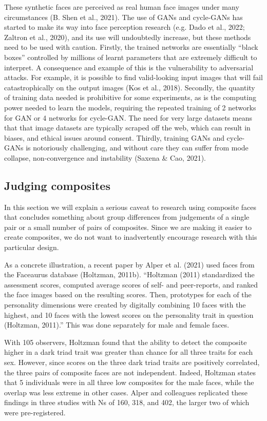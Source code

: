 \documentclass[
  man,floatsintext]{apa6}
\begin{document}
These synthetic faces are perceived as real human face images under many circumstances (B. Shen et al., 2021). The use of GANs and cycle-GANs has started to make its way into face perception research (e.g. Dado et al., 2022; Zaltron et al., 2020), and its use will undoubtedly increase, but these methods need to be used with caution. Firstly, the trained networks are essentially ``black boxes'' controlled by millions of learnt parameters that are extremely difficult to interpret. A consequence and example of this is the vulnerability to adversarial attacks. For example, it is possible to find valid-looking input images that will fail catastrophically on the output images (Kos et al., 2018). Secondly, the quantity of training data needed is prohibitive for some experiments, as is the computing power needed to learn the models, requiring the repeated training of 2 networks for GAN or 4 networks for cycle-GAN. The need for very large datasets means that that image datasets are typically scraped off the web, which can result in biases, and ethical issues around consent. Thirdly, training GANs and cycle-GANs is notoriously challenging, and without care they can suffer from mode collapse, non-convergence and instability (Saxena \& Cao, 2021).

\hypertarget{judging-composites}{%
\subsection{Judging composites}\label{judging-composites}}

In this section we will explain a serious caveat to research using composite faces that concludes something about group differences from judgements of a single pair or a small number of pairs of composites. Since we are making it easier to create composites, we do not want to inadvertently encourage research with this particular design.

As a concrete illustration, a recent paper by Alper et al. (2021) used faces from the Faceaurus database (Holtzman, 2011b). ``Holtzman (2011) standardized the assessment scores, computed average scores of self- and peer-reports, and ranked the face images based on the resulting scores. Then, prototypes for each of the personality dimensions were created by digitally combining 10 faces with the highest, and 10 faces with the lowest scores on the personality trait in question (Holtzman, 2011).'' This was done separately for male and female faces.

With 105 observers, Holtzman found that the ability to detect the composite higher in a dark triad trait was greater than chance for all three traits for each sex. However, since scores on the three dark triad traits are positively correlated, the three pairs of composite faces are not independent. Indeed, Holtzman states that 5 individuals were in all three low composites for the male faces, while the overlap was less extreme in other cases. Alper and colleagues replicated these findings in three studies with Ns of 160, 318, and 402, the larger two of which were pre-registered.
\end{document}
